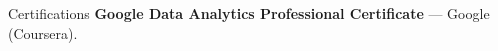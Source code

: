 
\begin{rubric}{Certifications}
  \entry*[2024] \textbf{Google Data Analytics Professional Certificate} — Google (Coursera).
\end{rubric}
